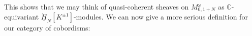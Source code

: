 \documentclass[11pt]{report}
\theoremstyle{definition}
\theoremstyle{remark}
\theoremstyle{remark}
\newcommand{\C}{\mathbb{C}}
\begin{document}
This shows that we may think of quasi-coherent sheaves on $M_{0,1+N}^\omega$ as $\C$-equivariant $\underline{\dot H}_N[K^{\pm 1}]$-modules. We can now give a more serious definition for our category of cobordisms:

%
%
\end{document}
